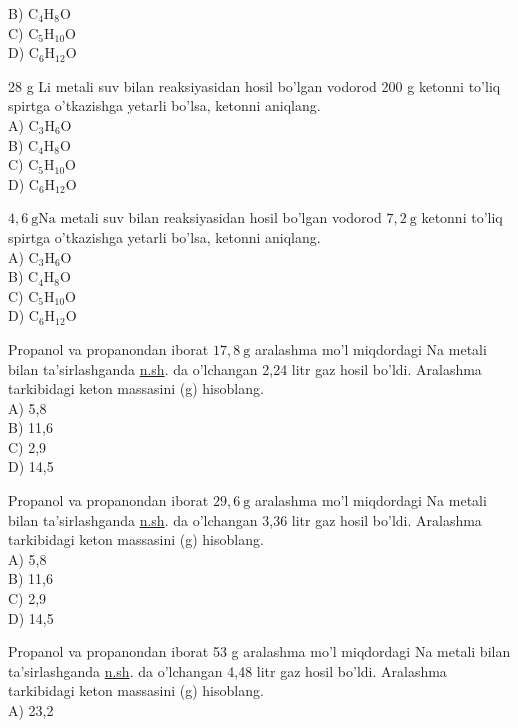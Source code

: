 B) $\mathrm{C}_{4} \mathrm{H}_{8} \mathrm{O}$\\
C) $\mathrm{C}_{5} \mathrm{H}_{10} \mathrm{O}$\\
D) $\mathrm{C}_{6} \mathrm{H}_{12} \mathrm{O}$
  \item 28 g Li metali suv bilan reaksiyasidan hosil bo'lgan vodorod 200 g ketonni to'liq spirtga o'tkazishga yetarli bo'lsa, ketonni aniqlang.\\
A) $\mathrm{C}_{3} \mathrm{H}_{6} \mathrm{O}$\\
B) $\mathrm{C}_{4} \mathrm{H}_{8} \mathrm{O}$\\
C) $\mathrm{C}_{5} \mathrm{H}_{10} \mathrm{O}$\\
D) $\mathrm{C}_{6} \mathrm{H}_{12} \mathrm{O}$
  \item $4,6 \mathrm{~g} \mathrm{Na}$ metali suv bilan reaksiyasidan hosil bo'lgan vodorod $7,2 \mathrm{~g}$ ketonni to'liq spirtga o'tkazishga yetarli bo'lsa, ketonni aniqlang.\\
A) $\mathrm{C}_{3} \mathrm{H}_{6} \mathrm{O}$\\
B) $\mathrm{C}_{4} \mathrm{H}_{8} \mathrm{O}$\\
C) $\mathrm{C}_{5} \mathrm{H}_{10} \mathrm{O}$\\
D) $\mathrm{C}_{6} \mathrm{H}_{12} \mathrm{O}$
  \item Propanol va propanondan iborat $17,8 \mathrm{~g}$ aralashma mo'l miqdordagi Na metali bilan ta'sirlashganda \href{http://n.sh}{n.sh}. da o'lchangan 2,24 litr gaz hosil bo'ldi. Aralashma tarkibidagi keton massasini (g) hisoblang.\\
A) 5,8\\
B) 11,6\\
C) 2,9\\
D) 14,5
  \item Propanol va propanondan iborat $29,6 \mathrm{~g}$ aralashma mo'l miqdordagi Na metali bilan ta'sirlashganda \href{http://n.sh}{n.sh}. da o'lchangan 3,36 litr gaz hosil bo'ldi. Aralashma tarkibidagi keton massasini (g) hisoblang.\\
A) 5,8\\
B) 11,6\\
C) 2,9\\
D) 14,5
  \item Propanol va propanondan iborat 53 g aralashma mo'l miqdordagi Na metali bilan ta'sirlashganda \href{http://n.sh}{n.sh}. da o'lchangan 4,48 litr gaz hosil bo'ldi. Aralashma tarkibidagi keton massasini (g) hisoblang.\\
A) 23,2\\

